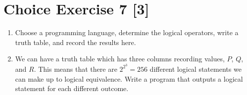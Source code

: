 \documentclass{article}
\begin{document}
\section*{Choice Exercise 7 [3]}

\begin{enumerate}
    \item {
        Choose a programming language, determine the logical operators, write a truth table, and record the results here.

        
    }

    \item {
        We can have a truth table which has three columns recording values, 
        \(P\), \(Q\), and \(R\). This means that there are \(2^{2^3} = 256\) 
        different logical statements we can make up to logical equivalence. 
        Write a program that outputs a logical statement for each different outcome.

        
    }
\end{enumerate}
\end{document}
